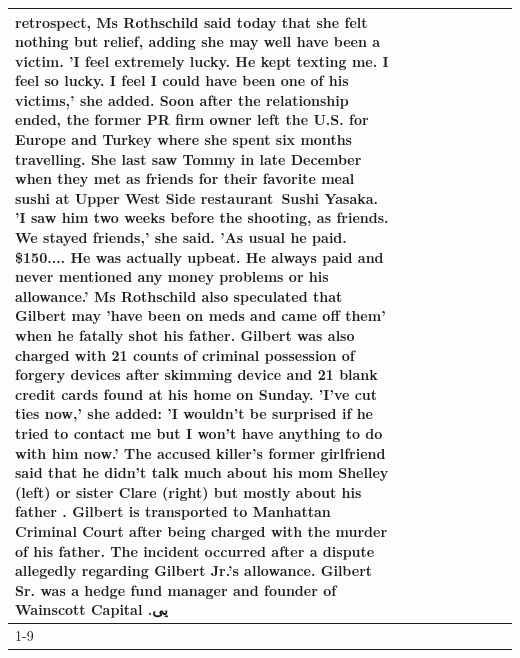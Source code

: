 \begin{table}[H]
\begin{tabular}{lllrlllll}
retrospect, Ms Rothschild said today that she felt nothing but relief, adding she may well have been a victim. 'I feel extremely lucky. He kept texting me. I feel so lucky. I feel I could have been one of his victims,' she added. Soon after the relationship ended, the former PR firm owner left the U.S. for Europe and Turkey where she spent six months  travelling. She last saw Tommy in late December when they met as friends for their favorite meal sushi at Upper West Side restaurant Sushi Yasaka. 'I saw him two weeks before the shooting, as friends. We stayed friends,' she said. 'As usual he paid. \$150.... He was actually upbeat. He always paid and never mentioned any money problems or his allowance.' Ms Rothschild also speculated that Gilbert may 'have been on meds and came off them' when he fatally shot his father. Gilbert was also charged with 21 counts of criminal possession of forgery devices after skimming device and 21 blank credit cards found at his home on Sunday. 'I've cut ties now,' she added: 'I wouldn’t be surprised if he tried to contact me but I won’t have anything to do with him now.' The accused killer's former girlfriend said that he didn't talk much about his mom Shelley (left) or sister Clare (right) but mostly about his father . Gilbert is transported to Manhattan Criminal Court  after being charged with the murder of his father. The incident occurred after a dispute allegedly regarding Gilbert Jr.'s allowance. Gilbert Sr. was a hedge fund manager and founder of Wainscott Capital .یی \\
\cline{1-9}

\end{tabular}
\end{table}

